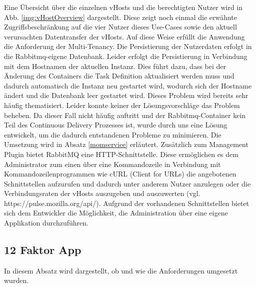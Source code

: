 Eine Übersicht über die einzelnen vHosts und die berechtigten Nutzer wird in Abb. \ref{img:vHostOverview} dargestellt. Diese zeigt noch einmal die erwähnte Zugriffsbeschränkung auf die vier Nutzer dieses Use-Cases sowie den aktuell verursachten Datentransfer der vHosts. Auf diese Weise erfüllt die Anwendung die Anforderung der Multi-Tenancy. Die Persistierung der Nutzerdaten erfolgt in die Rabbitmq-eigene Datenbank. Leider erfolgt die Persistierung in Verbindung mit dem Hostnamen der aktuellen Instanz. Dies führt dazu, dass bei der Änderung des Containers die Task Definition aktualisiert werden muss und dadurch automatisch die Instanz neu gestartet wird, wodurch sich der Hostname ändert und die Datenbank leer gestartet wird. Dieses Problem wird bereits sehr häufig thematisiert. Leider konnte keiner der Lösungsvorschläge das Problem beheben. Da dieser Fall nicht häufig auftritt und der Rabbitmq-Container kein Teil des Continuous Delivery Prozesses ist, wurde durch uns eine Lösung entwickelt, um die dadurch entstandenen Probleme zu minimieren. Die Umsetzung wird in Absatz \ref{momservice} erläutert. Zusätzlich zum Management Plugin bietet RabbitMQ eine HTTP-Schnittstelle. Diese ermöglichen es dem Administrator zum einen über eine Kommandozeile in Verbindung mit Kommandozeilenprogrammen wie cURL (Client for URLs) die angebotenen Schnittstellen aufzurufen und dadurch unter anderem Nutzer anzulegen oder die Verbindungsraten der vHosts auszugeben und auszuwerten (vgl. https://pulse.mozilla.org/api/). Aufgrund der vorhandenen Schnittstellen bietet sich dem Entwickler die Möglichkeit, die Administration über eine eigene Applikation durchzuführen. 
\subsection{12 Faktor App}\label{12FactorApp}
In diesem Absatz wird dargestellt, ob und wie die Anforderungen umgesetzt wurden.

